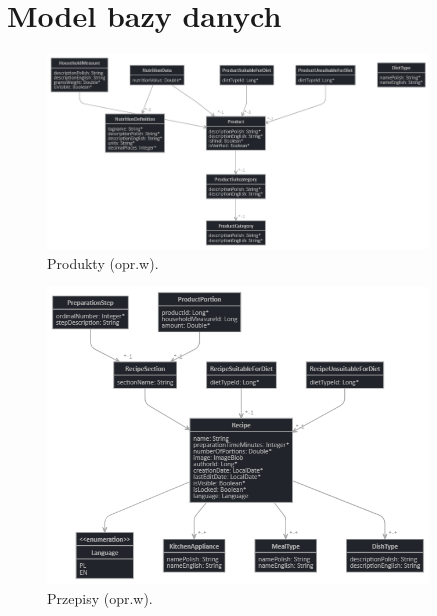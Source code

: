 \section{Model bazy danych}

\begin{minipage}{\textwidth}
    \begin{figure}[H]
        \centering\includegraphics[width=0.9\textwidth]{img/class-diagrams/produkty.png}
        \caption{Produkty (opr.w).}\label{rysunek:produkty}
    \end{figure}
\end{minipage}

\begin{minipage}{\textwidth}
    \begin{figure}[H]
        \centering\includegraphics[width=0.9\textwidth]{img/class-diagrams/przepisy.png}
        \caption{Przepisy (opr.w).}\label{rysunek:przepisy}
    \end{figure}
\end{minipage}

